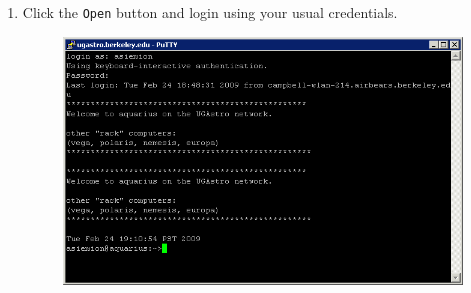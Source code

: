 \documentclass[11pt,preprint]{aastex}
\begin{document}
\begin{itemize}
\begin{enumerate}
\item Click the \verb$Open$ button and login using your usual credentials.

\begin{figure}[h!]
\begin{center}
\includegraphics[scale=0.5]{putty4a.png}
\end{center}
\end{figure}


\end{enumerate}
\end{itemize}
\end{document}
